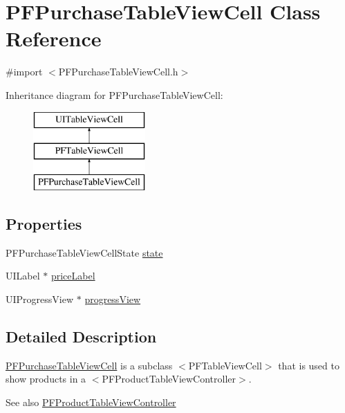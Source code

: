 \hypertarget{interface_p_f_purchase_table_view_cell}{}\section{P\+F\+Purchase\+Table\+View\+Cell Class Reference}
\label{interface_p_f_purchase_table_view_cell}


{\ttfamily \#import $<$P\+F\+Purchase\+Table\+View\+Cell.\+h$>$}

Inheritance diagram for P\+F\+Purchase\+Table\+View\+Cell\+:\begin{figure}[H]
\begin{center}
\leavevmode
\includegraphics[height=3.000000cm]{interface_p_f_purchase_table_view_cell}
\end{center}
\end{figure}
\subsection*{Properties}
\begin{DoxyCompactItemize}
\item 
P\+F\+Purchase\+Table\+View\+Cell\+State \hyperlink{interface_p_f_purchase_table_view_cell_a8cf6055cf2d5913a1b9ae6f547354fae}{state}
\item 
U\+I\+Label $\ast$ \hyperlink{interface_p_f_purchase_table_view_cell_a6378d4df911a53f6dca814d5f18af9aa}{price\+Label}
\item 
U\+I\+Progress\+View $\ast$ \hyperlink{interface_p_f_purchase_table_view_cell_a770a461f20f812e020c5b5daae002351}{progress\+View}
\end{DoxyCompactItemize}


\subsection{Detailed Description}
{\ttfamily \hyperlink{interface_p_f_purchase_table_view_cell}{P\+F\+Purchase\+Table\+View\+Cell}} is a subclass $<$\+P\+F\+Table\+View\+Cell$>$ that is used to show products in a $<$\+P\+F\+Product\+Table\+View\+Controller$>$.

\begin{DoxySeeAlso}{See also}
\hyperlink{interface_p_f_product_table_view_controller}{P\+F\+Product\+Table\+View\+Controller} 
\end{DoxySeeAlso}


